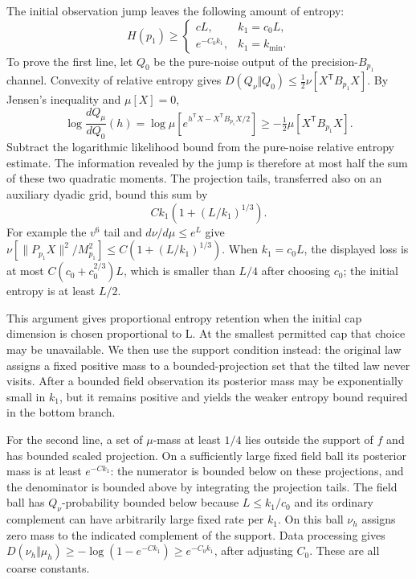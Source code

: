 The initial observation jump leaves the following amount of entropy:
\begin{equation}\label{cap:jump-retention}
 H(p_1)\ge
 \begin{cases}
  cL,& k_1=c_0L,\\
  e^{-C_0k_1},& k_1=k_{\min}.
 \end{cases}
\end{equation}
To prove the first line, let $Q_0$ be the pure-noise output of the
precision-$B_{p_1}$ channel. Convexity of relative entropy gives $D(Q_\nu\Vert
Q_0)\le\frac12\nu[X^{\mathsf T}B_{p_1}X]$. By Jensen's inequality and
$\mu[X]=0$,
\[
 \log\frac{dQ_\mu}{dQ_0}(h)
 =\log\mu\!\left[e^{h^{\mathsf T}X-X^{\mathsf T}B_{p_1}X/2}\right]
 \ge-\tfrac12\mu[X^{\mathsf T}B_{p_1}X].
\]
Subtract the logarithmic likelihood bound from the pure-noise relative entropy
estimate. The information revealed by the jump is therefore at most half the
sum of these two quadratic moments. The projection tails, transferred also on
an auxiliary dyadic grid, bound this sum by
\[
 Ck_1\left(1+(L/k_1)^{1/3}\right).
\]
For example the $v^6$ tail and $d\nu/d\mu\le e^L$ give
$\nu[\|P_{p_1}X\|^2/M_{p_1}^2]\le C(1+(L/k_1)^{1/3})$. When $k_1=c_0L$, the
displayed loss is at most $C(c_0+c_0^{2/3})L$, which is smaller than $L/4$
after choosing $c_0$; the initial entropy is at least $L/2$.

This argument gives proportional entropy retention when the initial cap
dimension is chosen proportional to L. At the smallest permitted cap that
choice may be unavailable. We then use the support condition instead: the
original law assigns a fixed positive mass to a bounded-projection set that
the tilted law never visits. After a bounded field observation its posterior
mass may be exponentially small in $k_1$, but it remains positive and yields
the weaker entropy bound required in the bottom branch.

For the second line, a set of $\mu$-mass at least $1/4$ lies outside the
support of $f$ and has bounded scaled projection. On a sufficiently large
fixed field ball its posterior mass is at least $e^{-Ck_1}$: the numerator is
bounded below on these projections, and the denominator is bounded above by
integrating the projection tails. The field ball has $Q_\nu$-probability
bounded below because $L\le k_1/c_0$ and its ordinary complement can have
arbitrarily large fixed rate per $k_1$. On this ball $\nu_h$ assigns zero mass
to the indicated complement of the support. Data processing gives
$D(\nu_h\Vert\mu_h)\ge-\log(1-e^{-Ck_1})\ge e^{-C_0k_1}$, after adjusting
$C_0$. These are all coarse constants.

